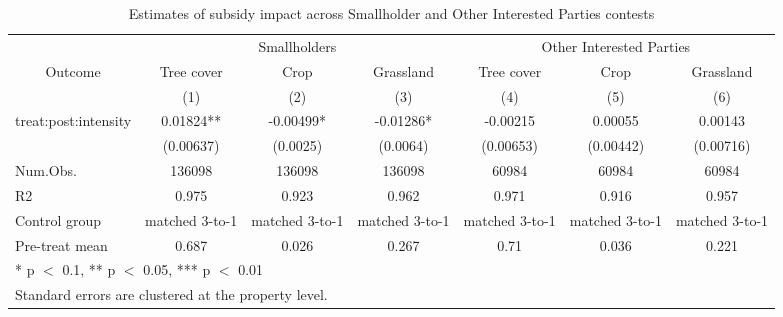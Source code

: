 \begin{table}[!h]
\centering\centering
\caption{\label{tab:twfe-contest}Estimates of subsidy impact across Smallholder and Other Interested Parties contests}
\centering
\begin{tabular}[t]{lcccccc}
\toprule
\multicolumn{1}{c}{ } & \multicolumn{3}{c}{Smallholders} & \multicolumn{3}{c}{Other Interested Parties} \\
\cmidrule(l{3pt}r{3pt}){2-4} \cmidrule(l{3pt}r{3pt}){5-7}
\multicolumn{1}{c}{Outcome} & \multicolumn{1}{c}{Tree cover} & \multicolumn{1}{c}{Crop} & \multicolumn{1}{c}{Grassland} & \multicolumn{1}{c}{Tree cover} & \multicolumn{1}{c}{Crop} & \multicolumn{1}{c}{Grassland} \\
\cmidrule(l{3pt}r{3pt}){1-1} \cmidrule(l{3pt}r{3pt}){2-2} \cmidrule(l{3pt}r{3pt}){3-3} \cmidrule(l{3pt}r{3pt}){4-4} \cmidrule(l{3pt}r{3pt}){5-5} \cmidrule(l{3pt}r{3pt}){6-6} \cmidrule(l{3pt}r{3pt}){7-7}
  & (1) & (2) & (3) & (4) & (5) & (6)\\
\midrule
treat:post:intensity & 0.01824** & -0.00499* & -0.01286* & -0.00215 & 0.00055 & 0.00143\\
 & (0.00637) & (0.0025) & (0.0064) & (0.00653) & (0.00442) & (0.00716)\\
\midrule
Num.Obs. & 136098 & 136098 & 136098 & 60984 & 60984 & 60984\\
R2 & 0.975 & 0.923 & 0.962 & 0.971 & 0.916 & 0.957\\
Control group & matched 3-to-1 & matched 3-to-1 & matched 3-to-1 & matched 3-to-1 & matched 3-to-1 & matched 3-to-1\\
Pre-treat mean & 0.687 & 0.026 & 0.267 & 0.71 & 0.036 & 0.221\\
\bottomrule
\multicolumn{7}{l}{\rule{0pt}{1em}* p $<$ 0.1, ** p $<$ 0.05, *** p $<$ 0.01}\\
\multicolumn{7}{l}{\rule{0pt}{1em}Standard errors are clustered at the property level.}\\
\end{tabular}
\end{table}
